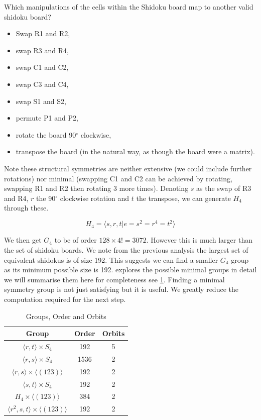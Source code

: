 \documentclass[a4paper,11pt]{report}
\begin{document}
Which manipulations of the cells within the Shidoku board map to another valid shidoku board? 
\begin{itemize}
\item Swap R1 and R2,
\item swap R3 and R4,
\item swap C1 and C2,
\item swap C3 and C4,
\item swap S1 and S2,
\item permute P1 and P2,
\item rotate the board 90$^\circ$ clockwise,
\item transpose the board (in the natural way, as though the board were a matrix).
\end{itemize}
Note these structural symmetries are neither extensive (we could include further rotations) nor minimal (swapping C1 and C2 can be achieved by rotating, swapping R1 and R2 then rotating 3 more times). Denoting $s$ as the swap of R3 and R4, $r$ the 90$^\circ$ clockwise rotation and $t$ the transpose, we can generate $H_4$ through these.

\begin{equation}H_4 = \langle s,r,t | e=s^2=r^4=t^2\rangle\end{equation}

We then get $G_4$ to be of order $128\times 4!=3072$. However this is much larger than the set of shidoku boards. We note from the previous analysis the largest set of equivalent shidokus is of size 192. This suggests we can find a smaller $G_4$ group as its minimum possible size is 192. \cite{} explores the possible minimal groups in detail we will summarise them here for completeness see \ref{table:group}. Finding a minimal symmetry group is not just satisfying but it is useful. We greatly reduce the computation required for the next step.

\begin{table}[!h]
\begin{center}
\begin{tabular}{ |c|c|c| }
 \hline
Group & Order & Orbits\\
 \hline
 $\langle r,t \rangle \times S_4$ & 192 & 5\\
 $\langle r,s \rangle \times S_4$ & 1536 & 2\\
 $\langle r,s \rangle \times \langle (123)\rangle$ & 192 & 2\\
 $\langle s,t \rangle \times S_4$ & 192 & 2\\
 $H_4 \times\langle (123) \rangle $ & 384 & 2\\
 $\langle r^2,s,t \rangle \times \langle (123) \rangle$ & 192 & 2\\
 \hline
\end{tabular}
\end{center}
\caption{\label{table:group}Groups, Order and Orbits}
\end{table}
\end{document}
